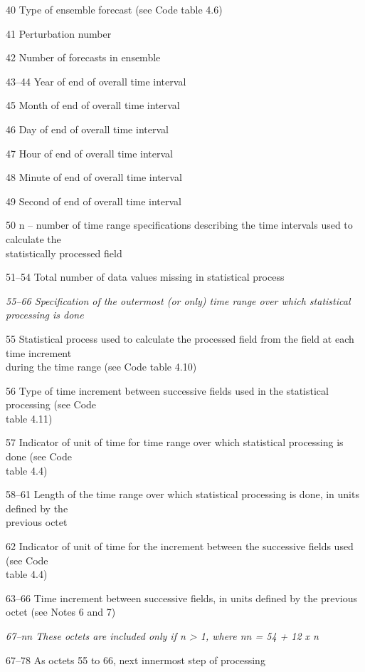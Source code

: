 40 Type of ensemble forecast (see Code table 4.6)

41 Perturbation number

42 Number of forecasts in ensemble

43--44 Year of end of overall time interval

45 Month of end of overall time interval

46 Day of end of overall time interval

47 Hour of end of overall time interval

48 Minute of end of overall time interval

49 Second of end of overall time interval

50 n -- number of time range specifications describing the time intervals used to calculate the\\
statistically processed field

51--54 Total number of data values missing in statistical process

\emph{55--66 Specification of the outermost (or only) time range over which statistical}\\
\emph{processing is done}

55 Statistical process used to calculate the processed field from the field at each time increment\\
during the time range (see Code table 4.10)

56 Type of time increment between successive fields used in the statistical processing (see Code\\
table 4.11)

57 Indicator of unit of time for time range over which statistical processing is done (see Code\\
table 4.4)

58--61 Length of the time range over which statistical processing is done, in units defined by the\\
previous octet

62 Indicator of unit of time for the increment between the successive fields used (see Code\\
table 4.4)

63--66 Time increment between successive fields, in units defined by the previous octet (see Notes 6 and 7)

\emph{67--nn These octets are included only if n \textgreater{} 1, where nn = 54 + 12 x n}

67--78 As octets 55 to 66, next innermost step of processing

